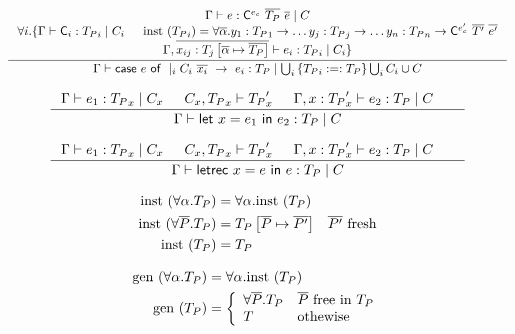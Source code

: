 \documentclass[10pt,a4paper]{article}
\begin{document}
$$
\inference{
	\hasTypeP{\penv}{e}
		{\tcon{\nhaskell{C}}{e_c}{\listOf{\pdTy}}{\listOf{e}}}{C} \\
	\forall i . \{
		\hasTypeP{\penv}{\nhaskell{C}_i}{\pdTy_i}{C_i} && 
		    \pdinst{\pdTy_i} = 
			{\tforallTy{\listOf{\alpha}}{
				\tfun{y_1}{\pdTy_1}{
				\tfun{\dots y_j}{\pdTy_j}{
				\tfun{\dots y_n}{\pdTy_n}{
				\tcon{\nhaskell{C}}{e'_c}{\listOf{\dTy'}}{\listOf{e'}}}}			
			}}} \\			
		\hasTypeP{\penv, \listOf{x_{ij} : {\dTy_j \subT{\listOf{\alpha}}{\listOf{\pdTy}} }}}{e_i}{\pdTy_i}{C_i}	
	\}
}{
	\hasTypeP{\penv}{\ecase{e}{C_i \ \listOf{x_i}}{e_i}}{\pdTy}{\bigcup_{i}{\{ \pdTy_i :=: \pdTy \}} \bigcup_{i} C_i \cup C}
}[]
$$

$$
\inference{
	\hasTypeP{\penv}{e_1}{\pdTy_x}{C_x} & \generalizeP{C_x}{\pdTy_x}{\pdTy_x'} &
	\hasTypeP{\penv, x:\pdTy_x'}{e_2}{\pdTy}{C} &
}{
	\hasTypeP{\penv}{\elet{x}{e_1}{e_2}}{\pdTy}{C}
}[]
$$

$$
\inference{
	\hasTypeP{\penv}{e_1}{\pdTy_x}{C_x} & \generalizeP{C_x}{\pdTy_x}{\pdTy_x'} &
	\hasTypeP{\penv, x:\pdTy_x'}{e_2}{\pdTy}{C} &
}{
	\hasTypeP{\penv}{\eletrec{x}{e}{e}}{\pdTy}{C}
}[]
$$

\hfill\fbox{\pdinst{\pdTy}}

\begin{align*}
\pdinst{\tforallTy{\alpha}{\pdTy}} & = \tforallTy{\alpha}{\pdinst{\pdTy}}\\
\pdinst{\tforallPr{\listOf{P}}{\pdTy}} & = 
		\pdTy \subP{\listOf{P}}{\listOf{P'}} & \listOf{P'} \ \text{fresh} \\
\pdinst{\pdTy} & = \pdTy
\end{align*}

\hfill\fbox{\pdgen{\pdTy}}

\begin{align*}
 \text{gen}\ (\forall \alpha . {T_P})  & = \forall \alpha .  \text{inst}\ ({T_P}) \\
 \text{gen}\ ({T_P})  & = 
	\left\{
		\begin{array}{ll}
		\forall \overline{P} . {T_P} & \overline{P} \ \text{free in } {T_P} \\
		T				 & \text{othewise} 
		\end{array}
	\right. \\
\end{align*}
\end{document}
